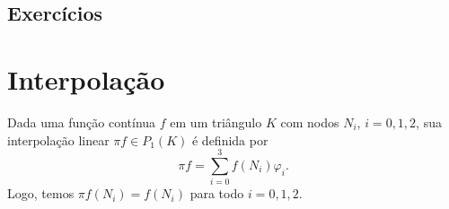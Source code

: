 \subsection{Exercícios}
\badgeConstrucao

\section{Interpolação}\label{cap_mef2d_sec_interp}
\badgeRevisar

Dada uma função contínua $f$ em um triângulo $K$ com nodos $N_i$, $i=0, 1, 2$, sua interpolação linear $\pi f \in P_1(K)$ é definida por
\begin{equation}
  \pi f = \sum_{i=0}^3 f(N_i)\varphi_i.
\end{equation}
Logo, temos $\pi f(N_i) = f(N_i)$ para todo $i=0, 1, 2$.

